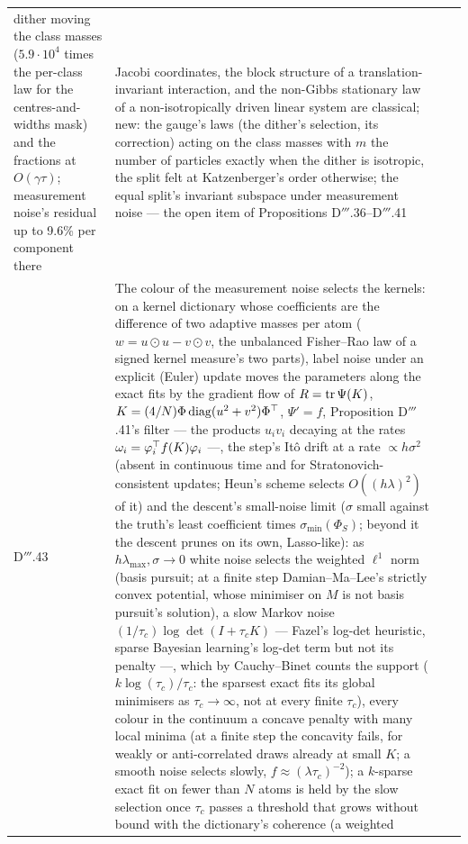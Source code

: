 {\begin{longtable}{@{}>{\raggedright\arraybackslash}p{}>{\raggedright\arraybackslash}p{}%
>{\raggedright\arraybackslash}p{}>{\raggedright\arraybackslash}p{}@{}}
dither moving the class masses ($5.9\cdot10^4$ times the per-class law for the centres-and-widths mask) and the
fractions at $O(\gamma\tau)$; measurement noise's residual up to 9.6\% per component there
& Jacobi coordinates, the block structure of a translation-invariant interaction, and the non-Gibbs stationary law of a
non-isotropically driven linear system are classical; new: the gauge's laws (the dither's selection, its correction)
acting on the class masses with $m$ the number of particles exactly when the dither is isotropic, the split felt at
Katzenberger's order otherwise; the equal split's invariant subspace under measurement noise --- the open item of
Propositions D$'''$.36--D$'''$.41\\
\addlinespace[0.5pt]
D$'''$.43 & The colour of the measurement noise selects the kernels: on a kernel dictionary whose coefficients are the
difference of two adaptive masses per atom ($w = u\odot u - v\odot v$, the unbalanced Fisher--Rao law of a signed
kernel measure's two parts), label noise under an explicit (Euler) update moves the parameters along the exact fits by
the gradient flow of $R = \operatorname{tr}\Psi(K)$, $K = (4/N)\Phi\operatorname{diag}(u^2 + v^2)\Phi^\top$, $\Psi' = f$, Proposition
D$'''$.41's filter --- the products $u_iv_i$ decaying at the rates $\omega_i = \varphi_i^\top f(K)\varphi_i$ ---, the
step's It\^o drift at a rate $\propto h\sigma^2$ (absent in continuous time and for Stratonovich-consistent updates;
Heun's scheme selects $O((h\lambda)^2)$ of it) and the descent's small-noise limit ($\sigma$ small against the truth's
least coefficient times $\sigma_{\min}(\Phi_S)$; beyond it the descent prunes on its own, Lasso-like): as
$h\lambda_{\max},\sigma\to0$ white noise selects the weighted $\ell^1$ norm (basis pursuit; at a finite step
Damian--Ma--Lee's strictly convex potential, whose minimiser on $M$ is not basis pursuit's solution), a slow Markov noise
$(1/\tau_c)\log\det(I + \tau_cK)$ --- Fazel's log-det heuristic, sparse Bayesian learning's log-det term but not its
penalty ---, which by Cauchy--Binet counts the support ($k\log(\tau_c)/\tau_c$: the sparsest exact fits its global
minimisers as $\tau_c\to\infty$, not at every finite $\tau_c$), every colour in the continuum a concave penalty with
many local minima (at a finite step the concavity fails, for weakly or anti-correlated draws already at small $K$; a
smooth noise selects slowly, $f\approx(\lambda\tau_c)^{-2}$); a $k$-sparse exact fit on fewer than $N$ atoms is held by
the slow selection once $\tau_c$ passes a threshold that grows without bound with the dictionary's coherence (a weighted

\end{longtable}}
